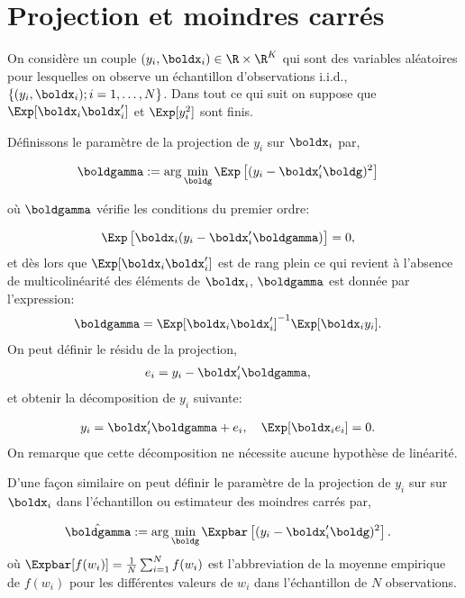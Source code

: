 \newpage

\tableofcontents

\newpage

\section{Projection et moindres carrés}

On considère un couple  $(y_i, \boldx_i) \in \R\times \R^K$ qui sont des variables aléatoires pour lesquelles 
on observe un échantillon d'observations i.i.d., $\{(y_i, \boldx_i) ; i=1, \ldots, N\}$. Dans tout ce qui suit 
on suppose que $\Exp[\boldx_i \boldx_i^\prime]$ et $\Exp[y_i^2]$ sont finis.

Définissons le paramètre de la projection de $y_i$ sur $\boldx_i$ par,

\begin{align*}
	\boldgamma &:=\arg\min_{\boldg}\Exp\left[(y_i - \boldx_i^\prime \boldg)^2\right]
\end{align*}

où $\boldgamma$ vérifie les conditions du premier ordre:

\begin{align*}
\Exp\left[\boldx_i(y_i - \boldx_i^\prime\boldgamma)\right] &=0,
\end{align*}
et dès lors que $\Exp[\boldx_i\boldx_i^\prime]$ est de rang plein ce qui revient 
à l'absence de multicolinéarité des éléments de $\boldx_i$, $\boldgamma$ est donnée par l'expression: 
\begin{align*}
	\boldgamma &= \Exp[\boldx_i\boldx_i^\prime]^{-1}\Exp[\boldx_iy_i].
\end{align*}
On peut définir le résidu de la projection,
\begin{align*} 
e_i &= y_i - \boldx_i^\prime\boldgamma,
\end{align*}
et obtenir la décomposition de $y_i$ suivante:

\begin{align*} 
y_i &= \boldx_i^\prime\boldgamma + e_i, \quad \Exp[\boldx_i e_i] = 0.
\end{align*}
On remarque que cette décomposition ne nécessite aucune hypothèse de linéarité.

D'une façon similaire on peut définir le paramètre de la projection de $y_i$ sur sur $\boldx_i$ dans
l'échantillon ou estimateur des moindres carrés par,

\begin{align*}
	\hat{\boldgamma} &:=\arg\min_{\boldg}\Expbar\left[(y_i - \boldx_i^\prime \boldg)^2\right].
\end{align*}
où $\Expbar[f(w_i)] = \frac{1}{N}\sum_{i=1}^N f(w_i)$ est l'abbreviation de la moyenne empirique de 
$f(w_i)$ pour les différentes valeurs de $w_i$ dans l'échantillon de $N$ observations.

